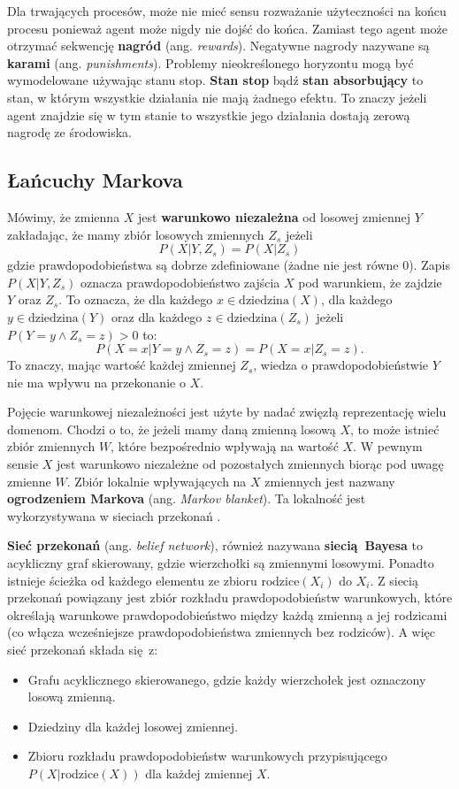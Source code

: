\documentclass[a4paper, 12pt,oneside]{book}
\begin{document}
Dla trwających procesów, może nie mieć sensu rozważanie użyteczności na końcu
procesu ponieważ agent może nigdy nie dojść do końca. Zamiast tego agent może
otrzymać sekwencję \textbf{nagród} (ang. \textit{rewards}).
Negatywne nagrody nazywane są \textbf{karami} (ang. \textit{punishments}).
Problemy nieokreślonego horyzontu mogą być wymodelowane używając stanu
stop. \textbf{Stan stop} bądź \textbf{stan absorbujący} to stan, w którym
wszystkie działania nie mają żadnego efektu. To znaczy jeżeli agent znajdzie
się w tym stanie to wszystkie jego działania dostają zerową nagrodę ze
środowiska.

\subsection{Łańcuchy Markova}
Mówimy, że zmienna $X$ jest \textbf{warunkowo niezależna} od losowej zmiennej
$Y$ zakładając, że mamy zbiór losowych zmiennych $Z_s$ jeżeli
\[P(X | Y, Z_s) = P(X| Z_s)\]
gdzie prawdopodobieństwa są dobrze zdefiniowane (żadne nie jest równe $0$).
Zapis $P(X| Y, Z_s)$ oznacza prawdopodobieństwo zajścia $X$ pod
warunkiem, że zajdzie $Y$ oraz $Z_s$. To oznacza, że dla każdego $x \in
\text{dziedzina}(X)$, dla każdego $y \in \text{dziedzina}(Y)$ oraz dla każdego
$z \in \text{dziedzina}(Z_s)$ jeżeli $P(Y = y \wedge Z_s = z) > 0$ to:
\[P(X=x|Y=y \wedge Z_s = z) = P(X=x|Z_s = z).\]
To znaczy, mając wartość każdej zmiennej $Z_s$, wiedza o prawdopodobieństwie
$Y$ nie ma wpływu na przekonanie o $X$.

Pojęcie warunkowej niezależności jest użyte by nadać zwięzłą reprezentację
wielu domenom. Chodzi o to, że jeżeli mamy daną zmienną losową $X$, to może
istnieć zbiór zmiennych $W$, które bezpośrednio wpływają na wartość $X$. W
pewnym sensie $X$ jest warunkowo niezależne od pozostałych zmiennych biorąc pod
uwagę  zmienne $W$. Zbiór lokalnie wpływających na $X$ zmiennych jest nazwany
\textbf{ogrodzeniem Markova} (ang. \textit{Markov blanket}). Ta lokalność
jest wykorzystywana w sieciach przekonań \cite{ai_foundations_belief_networks}.

\textbf{Sieć przekonań} (ang. \textit{belief network}), również nazywana
\textbf{siecią Bayesa} to acykliczny graf skierowany, gdzie wierzchołki są
zmiennymi losowymi. Ponadto istnieje ścieżka od każdego elementu ze zbioru
$\text{rodzice}(X_i)$ do $X_i$. Z siecią przekonań powiązany jest zbiór
rozkładu prawdopodobieństw warunkowych, które określają warunkowe
prawdopodobieństwo między każdą zmienną a jej rodzicami (co włącza wcześniejsze
prawdopodobieństwa zmiennych bez rodziców). A więc sieć przekonań składa się z:
\begin{itemize}
	\setlength\itemsep{-0.4em}
\item Grafu acyklicznego skierowanego, gdzie każdy wierzchołek jest oznaczony
	losową zmienną.
\item Dziedziny dla każdej losowej zmiennej.
\item Zbioru rozkładu prawdopodobieństw warunkowych przypisującego
	$P(X|\text{rodzice}(X))$ dla każdej zmiennej $X$.
\end{itemize}
\end{document}
